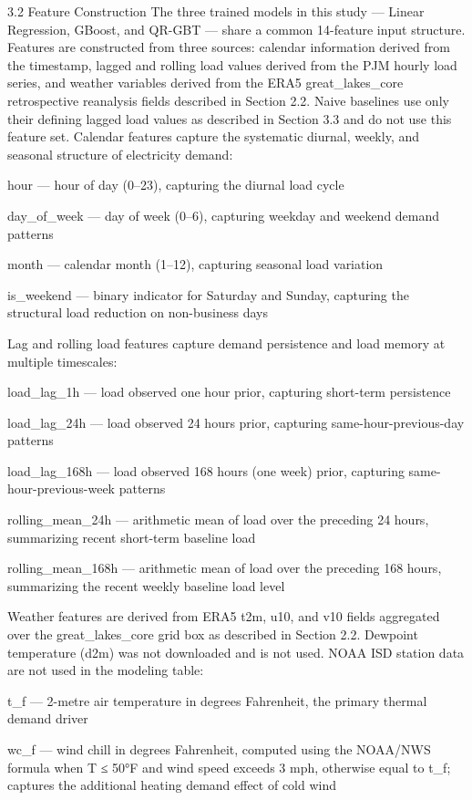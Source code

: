 3.2 Feature Construction
The three trained models in this study — Linear Regression, GBoost, and QR-GBT — share a common 14-feature input structure. Features are constructed from three sources: calendar information derived from the timestamp, lagged and rolling load values derived from the PJM hourly load series, and weather variables derived from the ERA5 great_lakes_core retrospective reanalysis fields described in Section 2.2. Naive baselines use only their defining lagged load values as described in Section 3.3 and do not use this feature set.
Calendar features capture the systematic diurnal, weekly, and seasonal structure of electricity demand:


hour — hour of day (0–23), capturing the diurnal load cycle


day_of_week — day of week (0–6), capturing weekday and weekend demand patterns


month — calendar month (1–12), capturing seasonal load variation


is_weekend — binary indicator for Saturday and Sunday, capturing the structural load reduction on non-business days


Lag and rolling load features capture demand persistence and load memory at multiple timescales:


load_lag_1h — load observed one hour prior, capturing short-term persistence


load_lag_24h — load observed 24 hours prior, capturing same-hour-previous-day patterns


load_lag_168h — load observed 168 hours (one week) prior, capturing same-hour-previous-week patterns


rolling_mean_24h — arithmetic mean of load over the preceding 24 hours, summarizing recent short-term baseline load


rolling_mean_168h — arithmetic mean of load over the preceding 168 hours, summarizing the recent weekly baseline load level


Weather features are derived from ERA5 t2m, u10, and v10 fields aggregated over the great_lakes_core grid box as described in Section 2.2. Dewpoint temperature (d2m) was not downloaded and is not used. NOAA ISD station data are not used in the modeling table:


t_f — 2-metre air temperature in degrees Fahrenheit, the primary thermal demand driver


wc_f — wind chill in degrees Fahrenheit, computed using the NOAA/NWS formula when T ≤ 50°F and wind speed exceeds 3 mph, otherwise equal to t_f; captures the additional heating demand effect of cold wind


